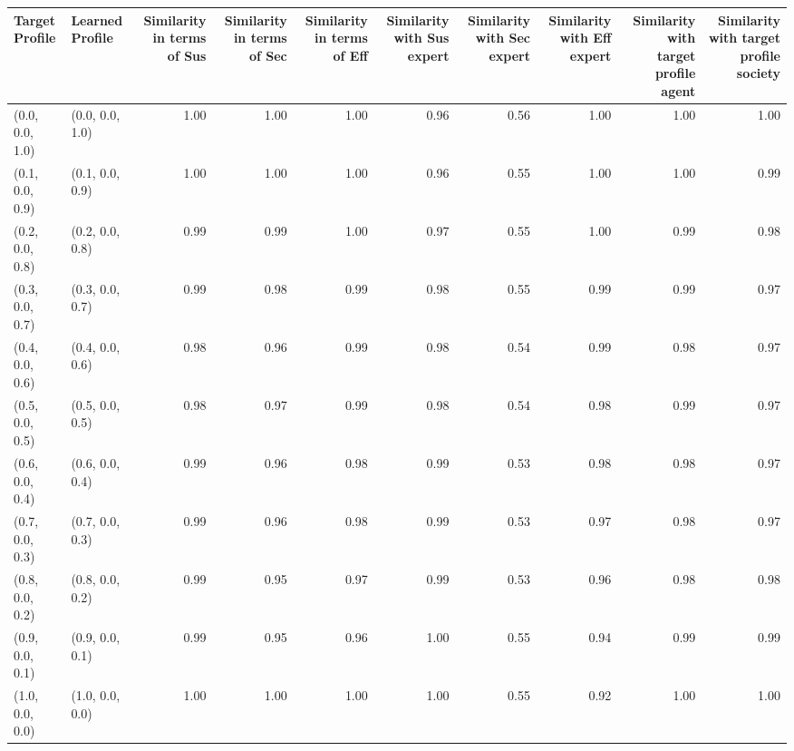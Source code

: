 \begin{tabular}{llrrrrrrrr}
\toprule
Target Profile & Learned Profile & Similarity in terms of Sus & Similarity in terms of Sec & Similarity in terms of Eff & Similarity with Sus expert & Similarity with Sec expert & Similarity with Eff expert & Similarity with target profile agent & Similarity with target profile society \\
\midrule
(0.0, 0.0, 1.0) & (0.0, 0.0, 1.0) & 1.00 & 1.00 & 1.00 & 0.96 & 0.56 & 1.00 & 1.00 & 1.00 \\
(0.1, 0.0, 0.9) & (0.1, 0.0, 0.9) & 1.00 & 1.00 & 1.00 & 0.96 & 0.55 & 1.00 & 1.00 & 0.99 \\
(0.2, 0.0, 0.8) & (0.2, 0.0, 0.8) & 0.99 & 0.99 & 1.00 & 0.97 & 0.55 & 1.00 & 0.99 & 0.98 \\
(0.3, 0.0, 0.7) & (0.3, 0.0, 0.7) & 0.99 & 0.98 & 0.99 & 0.98 & 0.55 & 0.99 & 0.99 & 0.97 \\
(0.4, 0.0, 0.6) & (0.4, 0.0, 0.6) & 0.98 & 0.96 & 0.99 & 0.98 & 0.54 & 0.99 & 0.98 & 0.97 \\
(0.5, 0.0, 0.5) & (0.5, 0.0, 0.5) & 0.98 & 0.97 & 0.99 & 0.98 & 0.54 & 0.98 & 0.99 & 0.97 \\
(0.6, 0.0, 0.4) & (0.6, 0.0, 0.4) & 0.99 & 0.96 & 0.98 & 0.99 & 0.53 & 0.98 & 0.98 & 0.97 \\
(0.7, 0.0, 0.3) & (0.7, 0.0, 0.3) & 0.99 & 0.96 & 0.98 & 0.99 & 0.53 & 0.97 & 0.98 & 0.97 \\
(0.8, 0.0, 0.2) & (0.8, 0.0, 0.2) & 0.99 & 0.95 & 0.97 & 0.99 & 0.53 & 0.96 & 0.98 & 0.98 \\
(0.9, 0.0, 0.1) & (0.9, 0.0, 0.1) & 0.99 & 0.95 & 0.96 & 1.00 & 0.55 & 0.94 & 0.99 & 0.99 \\
(1.0, 0.0, 0.0) & (1.0, 0.0, 0.0) & 1.00 & 1.00 & 1.00 & 1.00 & 0.55 & 0.92 & 1.00 & 1.00 \\
\bottomrule
\end{tabular}
